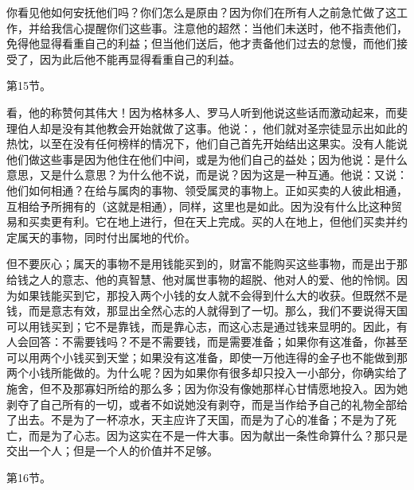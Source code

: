 你看见他如何安抚他们吗？你们怎么是原由？因为你们在所有人之前急忙做了这工作，并给我信心提醒你们这些事。注意他的超然：当他们未送时，他不指责他们，免得他显得看重自己的利益；但当他们送后，他才责备他们过去的怠慢，而他们接受了，因为此后他不能再显得看重自己的利益。\par

第15节。 \par

看，他的称赞何其伟大！因为格林多人、罗马人听到他说这些话而激动起来，而斐理伯人却是没有其他教会开始就做了这事。他说：，他们就对圣宗徒显示出如此的热忱，以至在没有任何榜样的情况下，他们自己首先开始结出这果实。没有人能说他们做这些事是因为他住在他们中间，或是为他们自己的益处；因为他说：是什么意思，又是什么意思？为什么他不说，而是说？因为这是一种互通。他说：又说：他们如何相通？在给与属肉的事物、领受属灵的事物上。正如买卖的人彼此相通，互相给予所拥有的（这就是相通），同样，这里也是如此。因为没有什么比这种贸易和买卖更有利。它在地上进行，但在天上完成。买的人在地上，但他们买卖并约定属天的事物，同时付出属地的代价。\par

但不要灰心；属天的事物不是用钱能买到的，财富不能购买这些事物，而是出于那给钱之人的意志、他的真智慧、他对属世事物的超脱、他对人的爱、他的怜悯。因为如果钱能买到它，那投入两个小钱的女人就不会得到什么大的收获。但既然不是钱，而是意志有效，那显出全然心志的人就得到了一切。那么，我们不要说得天国可以用钱买到；它不是靠钱，而是靠心志，而这心志是通过钱来显明的。因此，有人会回答：不需要钱吗？不是不需要钱，而是需要准备；如果你有这准备，你甚至可以用两个小钱买到天堂；如果没有这准备，即使一万他连得的金子也不能做到那两个小钱所能做的。为什么呢？因为如果你有很多却只投入一小部分，你确实给了施舍，但不及那寡妇所给的那么多；因为你没有像她那样心甘情愿地投入。因为她剥夺了自己所有的一切，或者不如说她没有剥夺，而是当作给予自己的礼物全部给了出去。不是为了一杯凉水，天主应许了天国，而是为了心的准备；不是为了死亡，而是为了心志。因为这实在不是一件大事。因为献出一条性命算什么？那只是交出一个人；但是一个人的价值并不足够。\par

第16节。\par

